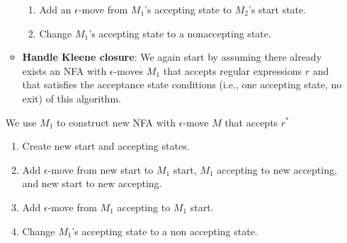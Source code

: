 \documentclass{report}
\begin{document}
\begin{itemize}
\begin{itemize}
\begin{figure}[ht]
            \centering
            \label{fig:crit6}
        \end{figure}
        \bigbreak \noindent 
        \begin{enumerate}
            \item Add an $\epsilon$-move from $M_{1}$'s accepting state to $M_{2}$'s start state.
            \item Change $M_{1}$'s accepting state to a nonaccepting state.
        \end{enumerate}
        \pagebreak 
    \item \textbf{Handle Kleene closure}: We again start by assuming there already exists an NFA with $\epsilon$-moves $M_{1}$ that accepts regular expressions $r$ and that satisfies the acceptance state conditions (i.e., one accepting state, no exit) of this algorithm.
        \bigbreak \noindent 
        \begin{figure}[ht]
            \centering
            \label{fig:crit7}
        \end{figure}
\end{itemize}
\bigbreak \noindent 
We use $M_{1}$ to construct new NFA with $\epsilon$-move $M$ that accepts $r^{*}$
\begin{figure}[ht]
    \centering
    \label{fig:crit9}
\end{figure}
\bigbreak \noindent 
\begin{enumerate}
    \item Create new start and accepting states.
    \item Add $\epsilon$-move from new start to $M_{1}$ start, $M_{1}$ accepting to new accepting, and new start to new accepting.
    \item Add $\epsilon$-move from $M_{1}$ accepting to $M_{1}$ start. 
    \item Change $M_{1}$'s accepting state to a non accepting state.
\end{enumerate}


\end{itemize}
\end{document}
